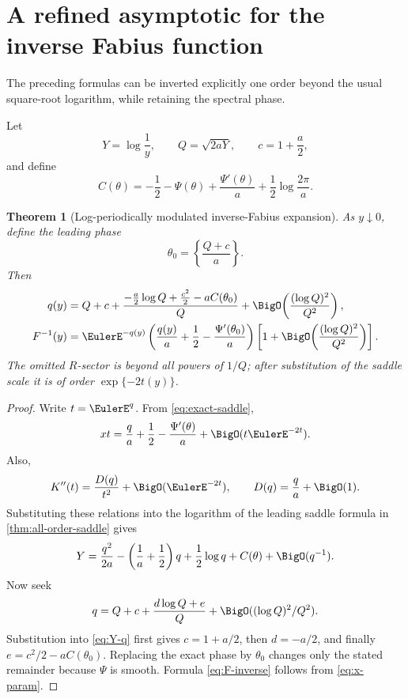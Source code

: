 \documentclass[11pt,oneside]{article}
\newtheorem{theorem}{Theorem}[section]
\theoremstyle{definition}
\theoremstyle{remark}
\begin{document}
\section{A refined asymptotic for the inverse Fabius function}

The preceding formulas can be inverted explicitly one order beyond the usual
square-root logarithm, while retaining the spectral phase.

Let
\[
 Y=\log\frac1y,\qquad
 Q=\sqrt{2aY},\qquad
 c=1+\frac a2,
\]
and define
\begin{equation}
 C(\theta)
 =-\frac12-\Psi(\theta)
   +\frac{\Psi'(\theta)}a
   +\frac12\log\frac{2\pi}{a}.
 \label{eq:Ctheta}
\end{equation}

\begin{theorem}[Log-periodically modulated inverse-Fabius expansion]
\label{thm:inverse-Fabius}
As \(y\downarrow0\), define the leading phase
\[
 \theta_0=
 \left\{\frac{Q+c}{a}\right\}.
\]
Then
\begin{align}
 q(y)
 ={}&
 Q+c+
 \frac{
  -\frac a2\log Q+\frac{c^2}{2}-aC(\theta_0)
 }{Q}
 +\BigO\!\left(\frac{(\log Q)^2}{Q^2}\right),
 \label{eq:q-inverse}\\
 F^{-1}(y)
 ={}&
 \EulerE^{-q(y)}
 \left(
  \frac{q(y)}a+\frac12
  -\frac{\Psi'(\theta_0)}a
 \right)
 \left[
  1+\BigO\!\left(\frac{(\log Q)^2}{Q^2}\right)
 \right].
 \label{eq:F-inverse}
\end{align}
The omitted \(R\)-sector is beyond all powers of \(1/Q\); after substitution
of the saddle scale it is of order
\(\exp\{-2t(y)\}\).
\end{theorem}

\begin{proof}
Write \(t=\EulerE^q\).  From \eqref{eq:exact-saddle},
\[
 xt=\frac q a+\frac12-\frac{\Psi'(\theta)}a+\BigO(t\EulerE^{-2t}).
 \label{eq:x-param}
\]
Also,
\[
 K''(t)
 =\frac{D(q)}{t^2}+\BigO(\EulerE^{-2t}),
 \qquad
 D(q)=\frac q a+\BigO(1).
\]
Substituting these relations into the logarithm of the leading saddle formula
in \cref{thm:all-order-saddle} gives
\begin{equation}
 Y
 =\frac{q^2}{2a}
  -\left(\frac1a+\frac12\right)q
  +\frac12\log q
  +C(\theta)
  +\BigO(q^{-1}).
 \label{eq:Y-q}
\end{equation}
Now seek
\[
 q=Q+c+\frac{d\log Q+e}{Q}
   +\BigO((\log Q)^2/Q^2).
\]
Substitution into \eqref{eq:Y-q} first gives
\(c=1+a/2\), then \(d=-a/2\), and finally
\(e=c^2/2-aC(\theta_0)\).  Replacing the exact phase by \(\theta_0\)
changes only the stated remainder because \(\Psi\) is smooth.  Formula
\eqref{eq:F-inverse} follows from \eqref{eq:x-param}.
\end{proof}
\end{document}
